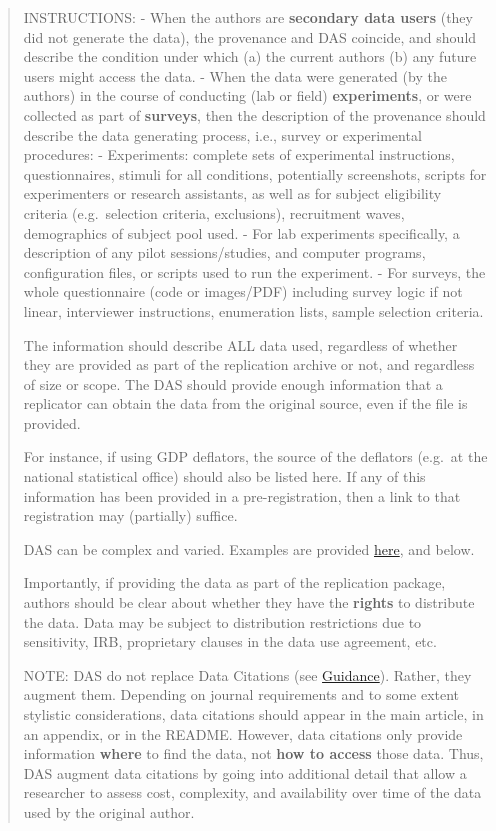 \documentclass[
]{article}
\begin{document}
\begin{quote}
INSTRUCTIONS: - When the authors are \textbf{secondary data users} (they
did not generate the data), the provenance and DAS coincide, and should
describe the condition under which (a) the current authors (b) any
future users might access the data. - When the data were generated (by
the authors) in the course of conducting (lab or field)
\textbf{experiments}, or were collected as part of \textbf{surveys},
then the description of the provenance should describe the data
generating process, i.e., survey or experimental procedures: -
Experiments: complete sets of experimental instructions, questionnaires,
stimuli for all conditions, potentially screenshots, scripts for
experimenters or research assistants, as well as for subject eligibility
criteria (e.g.~selection criteria, exclusions), recruitment waves,
demographics of subject pool used. - For lab experiments specifically, a
description of any pilot sessions/studies, and computer programs,
configuration files, or scripts used to run the experiment. - For
surveys, the whole questionnaire (code or images/PDF) including survey
logic if not linear, interviewer instructions, enumeration lists, sample
selection criteria.

The information should describe ALL data used, regardless of whether
they are provided as part of the replication archive or not, and
regardless of size or scope. The DAS should provide enough information
that a replicator can obtain the data from the original source, even if
the file is provided.

For instance, if using GDP deflators, the source of the deflators
(e.g.~at the national statistical office) should also be listed here. If
any of this information has been provided in a pre-registration, then a
link to that registration may (partially) suffice.

DAS can be complex and varied. Examples are provided
\href{https://social-science-data-editors.github.io/guidance/Requested_information_dcas.html}{here},
and below.

Importantly, if providing the data as part of the replication package,
authors should be clear about whether they have the \textbf{rights} to
distribute the data. Data may be subject to distribution restrictions
due to sensitivity, IRB, proprietary clauses in the data use agreement,
etc.

NOTE: DAS do not replace Data Citations (see
\href{https://social-science-data-editors.github.io/template_README/Data_citation_guidance.html}{Guidance}).
Rather, they augment them. Depending on journal requirements and to some
extent stylistic considerations, data citations should appear in the
main article, in an appendix, or in the README. However, data citations
only provide information \textbf{where} to find the data, not
\textbf{how to access} those data. Thus, DAS augment data citations by
going into additional detail that allow a researcher to assess cost,
complexity, and availability over time of the data used by the original
author.
\end{quote}
\end{document}
